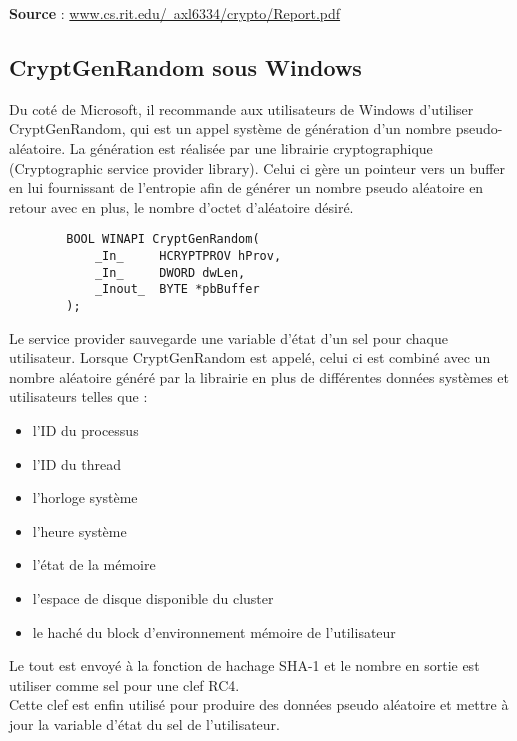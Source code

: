 \documentclass{article}
\begin{document}
		\textbf{Source} :
		\href{http://www.cs.rit.edu/~axl6334/crypto/Report.pdf}
		{www.cs.rit.edu/~axl6334/crypto/Report.pdf}
		
		
		
	
	\subsection{CryptGenRandom sous Windows}
	
		Du coté de Microsoft, il recommande aux utilisateurs de Windows 
		d’utiliser CryptGenRandom, qui est un appel système de génération d’un 
		nombre pseudo-aléatoire. La génération est réalisée par une librairie 
		cryptographique (Cryptographic service provider library). Celui ci gère 
		un pointeur vers un buffer en lui fournissant de l’entropie afin de 
		générer un nombre pseudo aléatoire en retour avec en plus, le nombre 
		d’octet d’aléatoire désiré.\\

		\lstset{language=Java}
		\begin{lstlisting}
		BOOL WINAPI CryptGenRandom(
			_In_     HCRYPTPROV hProv,
			_In_     DWORD dwLen,
			_Inout_  BYTE *pbBuffer
		);
		\end{lstlisting}
	
		Le service provider sauvegarde une variable d’état d’un sel pour chaque 
		utilisateur. Lorsque CryptGenRandom est appelé, celui ci est combiné 
		avec un nombre aléatoire généré par la librairie en plus de différentes 
		données systèmes et utilisateurs telles que : \\
		\begin{itemize}
		\item l’ID du processus
		\item l'ID du thread
		\item l'horloge système
		\item l'heure système
		\item l'état de la mémoire
		\item l’espace de disque disponible du cluster
		\item le haché du block d'environnement mémoire de l’utilisateur\\
		\end{itemize} 
		
		Le tout est envoyé à la fonction de hachage SHA-1 et le nombre en sortie 
		est utiliser comme sel pour une clef RC4. \\
		
		Cette clef est enfin utilisé pour produire des données pseudo aléatoire 
		et mettre à jour la variable d’état du sel de l’utilisateur. 
\end{document}
